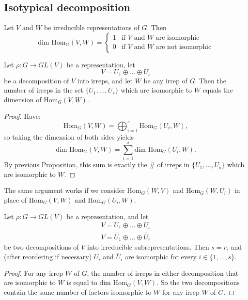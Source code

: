 \subsection{Isotypical decomposition}
\begin{frame}
\begin{proposition}
Let $V$ and $W$ be irreducible representations of $G$.  Then
\[ \text{dim Hom}_G (V,W) =  \begin{cases} 
1 & \mbox{if $V$ and $W$ are isomorphic}  \\
0 &\mbox{if $V$ and $W$ are not isomorphic}
\end{cases} \]
\end{proposition}
\end{frame}

\begin{frame}
\begin{proposition}
Let $\rho \colon G \to GL(V)$ be a representation, let \[ V = U_1 \oplus \ldots \oplus U_s \] be a decomposition of $V$ into irreps, and let $W$ be any irrep of $G$.  Then the number of irreps in the set  $ \{ U_1, \ldots, U_s \}$ which are isomorphic to $W$ equals the dimension of $\text{Hom}_G(V,W)$.
\end{proposition}
\end{frame}

\begin{frame}
\begin{proof}
Have:  \[ \text{Hom}_G(V,W) = \bigoplus_{i=1}^s \text{Hom}_G(U_i, W) ,\]
 so taking the dimension of both sides yields \[  \text{dim Hom}_G(V,W) = \sum_{i=1}^s \text{dim Hom}_G(U_i, W). \]
 By previous Proposition, this sum is exactly the \# of irreps in $\{ U_1, \ldots, U_s \}$ which are isomorphic to $W$.
\end{proof}
\end{frame}
\begin{note}
The same argument works if we consider $\text{Hom}_G(W,V)$ and $\text{Hom}_G(W,U_i)$ in place of $\text{Hom}_G(V,W)$ and $\text{Hom}_G(U_i,W)$.
\end{note}

\begin{frame}
\begin{theorem}
Let $\rho \colon G \to GL(V)$ be a representation, and let
\begin{align*}
V = U_1 \oplus \ldots \oplus U_s \\
V = \widetilde{U_1} \oplus \ldots \oplus \widetilde{U_r}
\end{align*}
be two decompositions of $V$ into irreducible subrepresentations.  Then $s = r$, and (after reordering if necessary) $U_i$ and $\widetilde{U_i}$ are isomorphic for every $i \in \{1, \ldots, s\}$.
\end{theorem}
\begin{proof}
For any irrep $W$ of $G$, the number of irreps in either decomposition that are isomorphic to $W$ is equal to $\text{dim Hom}_G(V,W)$.  So the two decompositions contain the same number of factors isomorphic to $W$ for any irrep $W$ of $G$.
\end{proof}
\end{frame}

